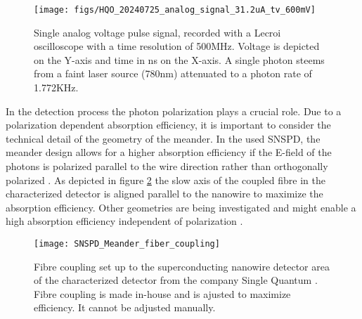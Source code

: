 \begin{figure}
    \centering
    \texttt{[image: figs/HQO\_20240725\_analog\_signal\_31.2uA\_tv\_600mV]}
    \caption{Single analog voltage pulse signal, recorded with a Lecroi oscilloscope with a time resolution of 500MHz.
    Voltage is depicted on the Y-axis and time in ns on the X-axis. A single photon steems from a faint laser source (780nm) attenuated to a photon rate of 1.772KHz.}
    \label{fig:SNSPD_single_voltage_pulse}
\end{figure}

In the detection process the photon polarization plays a crucial role.
Due to a polarization dependent absorption efficiency, it is important to consider the technical detail of the geometry of the meander.
In the used SNSPD, the meander design allows for a higher absorption efficiency if the E-field of the photons
is polarized parallel to the wire direction rather than orthogonally polarized \cite{single-quantum-2022}.
As depicted in figure \ref{fig:SNSPD_fiber_coupling} the slow axis of the coupled fibre in the characterized
detector is aligned parallel to the nanowire to maximize the absorption efficiency.
Other geometries are being investigated and might enable a high absorption efficiency independent of polarization \cite{zheng-2016}.

\begin{figure}
    \centering
    \texttt{[image: SNSPD\_Meander\_fiber\_coupling]}
    \caption{Fibre coupling set up to the superconducting nanowire detector area of the characterized detector from the company Single Quantum \cite{singlequantum_snsd}.
    Fibre coupling is made in-house and is ajusted to maximize efficiency. It cannot be adjusted manually.}
    \label{fig:SNSPD_fiber_coupling}
\end{figure}

